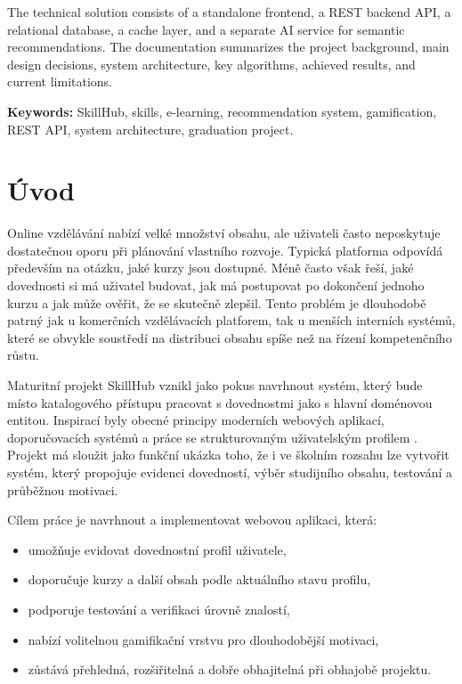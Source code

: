 \documentclass[12pt,a4paper]{report}
\begin{document}
The technical solution consists of a standalone frontend, a REST backend API, a relational database, a cache layer, and a separate AI service for semantic recommendations. The documentation summarizes the project background, main design decisions, system architecture, key algorithms, achieved results, and current limitations.

\vspace{0.7cm}
\noindent\textbf{Keywords:} SkillHub, skills, e-learning, recommendation system, gamification, REST API, system architecture, graduation project.

\clearpage
\begingroup
\small
{}
\tableofcontents
\endgroup
\clearpage
\hypersetup{pageanchor=true}
\setcounter{page}{8}

\chapter*{Úvod}
Online vzdělávání nabízí velké množství obsahu, ale uživateli často neposkytuje dostatečnou oporu při plánování vlastního rozvoje. Typická platforma odpovídá především na otázku, jaké kurzy jsou dostupné. Méně často však řeší, jaké dovednosti si má uživatel budovat, jak má postupovat po dokončení jednoho kurzu a jak může ověřit, že se skutečně zlepšil. Tento problém je dlouhodobě patrný jak u komerčních vzdělávacích platforem, tak u menších interních systémů, které se obvykle soustředí na distribuci obsahu spíše než na řízení kompetenčního růstu.

Maturitní projekt SkillHub vznikl jako pokus navrhnout systém, který bude místo katalogového přístupu pracovat s dovednostmi jako s hlavní doménovou entitou. Inspirací byly obecné principy moderních webových aplikací, doporučovacích systémů a práce se strukturovaným uživatelským profilem \cite{next,react,express,reimers}. Projekt má sloužit jako funkční ukázka toho, že i ve školním rozsahu lze vytvořit systém, který propojuje evidenci dovedností, výběr studijního obsahu, testování a průběžnou motivaci.

Cílem práce je navrhnout a implementovat webovou aplikaci, která:
\begin{itemize}
  \item umožňuje evidovat dovednostní profil uživatele,
  \item doporučuje kurzy a další obsah podle aktuálního stavu profilu,
  \item podporuje testování a verifikaci úrovně znalostí,
  \item nabízí volitelnou gamifikační vrstvu pro dlouhodobější motivaci,
  \item zůstává přehledná, rozšiřitelná a dobře obhajitelná při obhajobě projektu.
\end{itemize}
\end{document}
